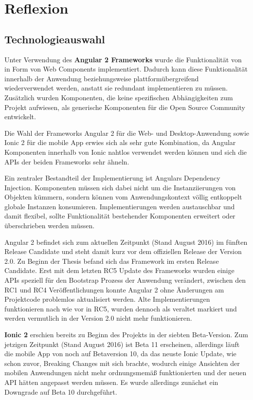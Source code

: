 
\chapter{Reflexion}

\label{chap:reflexion}

\section{Technologieauswahl}

Unter Verwendung des \textbf{Angular 2 Frameworks} wurde die Funktionalität von \projectname{} in Form von
Web Components implementiert.
Dadurch kann diese Funktionalität innerhalb der Anwendung beziehungsweise plattformübergreifend wiederverwendet werden, anstatt sie redundant implementieren zu müssen.
Zusätzlich wurden Komponenten, die keine spezifischen Abhängigkeiten zum Projekt aufwiesen, als
generische Komponenten für die Open Source Community entwickelt.

Die Wahl der Frameworks Angular 2 für die Web- und Desktop-Anwendung sowie Ionic 2 für
die mobile App erwies sich als sehr gute Kombination,
da Angular Komponenten innerhalb von Ionic nahtlos verwendet werden können
und sich die APIs der beiden Frameworks sehr ähneln.

Ein zentraler Bestandteil der Implementierung ist Angulars Dependency Injection.
Komponenten müssen sich dabei nicht um die Instanziierungen von Objekten kümmern,
sondern können vom Anwendungskontext völlig entkoppelt globale Instanzen konsumieren.
Implementierungen werden austauschbar und damit flexibel,
sollte Funktionalität bestehender Komponenten erweitert oder überschrieben werden müssen.

Angular 2 befindet sich zum aktuellen Zeitpunkt (Stand August 2016) im fünften Release Candidate und steht damit kurz
vor dem offiziellen Release der Version 2.0. Zu Beginn der Thesis befand sich das Framework im ersten Release Candidate.
Erst mit dem letzten RC5 Update des Frameworks wurden einige APIs speziell für den Bootstrap Prozess der Anwendung verändert,
zwischen den RC1 und RC4 Veröffentlichungen konnte Angular 2 ohne Änderungen am Projektcode problemlos
aktualisiert werden. Alte Implementierungen funktionieren nach wie vor in RC5,
wurden dennoch als veraltet markiert und werden vermutlich in der Version 2.0 nicht mehr
funktionieren.


\textbf{Ionic 2} erschien bereits zu Beginn des Projekts in der siebten Beta-Version.
Zum jetzigen Zeitpunkt (Stand August 2016) ist Beta 11 erscheinen, allerdings läuft die mobile App von
\projectname{} noch auf Betaversion 10, da das neuste Ionic Update,
wie schon zuvor, Breaking Changes mit sich brachte, wodurch einige Ansichten der
mobilen Anwendungen nicht mehr ordnungsmemäß funktionierten und der neuen API hätten angepasst werden müssen.
Es wurde allerdings zunächst ein Downgrade auf Beta 10 durchgeführt.

